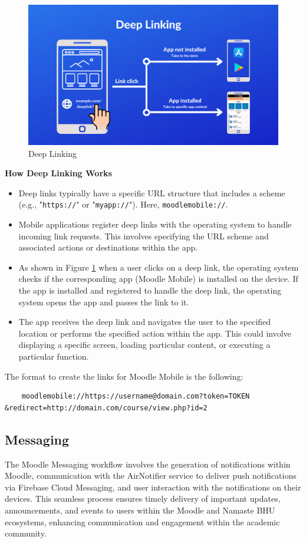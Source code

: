 \begin{figure}[h]
    \centering
    \includegraphics[width=0.75\linewidth]{assets/img/deeplinking.png}
    \caption{Deep Linking}
    \label{fig:deep-linking}
\end{figure}

\textbf{How Deep Linking Works}
\begin{itemize}
    \item Deep links typically have a specific URL structure that includes a scheme (e.g., "\texttt{https://}" or "\texttt{myapp://}"). Here, \texttt{moodlemobile://}.
    \item Mobile applications register deep links with the operating system to handle incoming link requests. This involves specifying the URL scheme and associated actions or destinations within the app.
    \item As shown in Figure \ref{fig:deep-linking} when a user clicks on a deep link, the operating system checks if the corresponding app (Moodle Mobile) is installed on the device. If the app is installed and registered to handle the deep link, the operating system opens the app and passes the link to it.
    \item The app receives the deep link and navigates the user to the specified location or performs the specified action within the app. This could involve displaying a specific screen, loading particular content, or executing a particular function.
\end{itemize}

The format to create the links for Moodle Mobile is the following:
\begin{verbatim}
    moodlemobile://https://username@domain.com?token=TOKEN &redirect=http://domain.com/course/view.php?id=2
\end{verbatim}



\subsection{Messaging}
The Moodle Messaging workflow involves the generation of notifications within Moodle, communication with the AirNotifier service to deliver push notifications via Firebase Cloud Messaging, and user interaction with the notifications on their devices. This seamless process ensures timely delivery of important updates, announcements, and events to users within the Moodle and Namaste BHU ecosystems, enhancing communication and engagement within the academic community.

